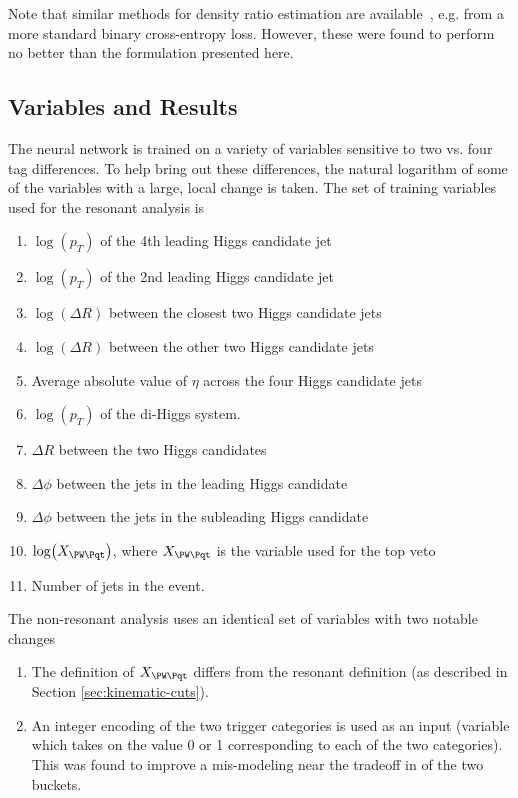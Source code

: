 Note that similar methods for density ratio estimation are available~\cite{NNRW-Nachman},
e.g. from a more standard binary cross-entropy loss. However, these were found to
perform no better than the formulation presented here.

\subsection{Variables and Results}
The neural network is trained on a variety of variables sensitive to two vs.
four tag differences. To help bring out these differences, the natural logarithm 
of some of the variables with a large, local change is taken. The 
set of training variables used for the resonant analysis is
\begin{enumerate}
	\item $\log(p_T)$ of the 4th leading Higgs candidate jet
	\item $\log(p_T)$ of the 2nd leading Higgs candidate jet
	\item $\log(\Delta R)$ between the closest two Higgs candidate jets
	\item $\log(\Delta R)$ between the other two Higgs candidate jets
	\item Average absolute value of $\eta$ across the four Higgs candidate jets
	\item $\log(p_T)$ of the di-Higgs system.
	\item $\Delta R$ between the two Higgs candidates
	\item $\Delta \phi$ between the jets in the leading Higgs candidate
	\item $\Delta \phi$ between the jets in the subleading Higgs candidate
	\item $\log(X_{\PW\Pqt})$, where $X_{\PW\Pqt}$ is the variable used for the top veto
	\item Number of jets in the event.
\end{enumerate}
The non-resonant analysis uses an identical set of variables with two notable changes
\begin{enumerate}
	\item The definition of $X_{\PW\Pqt}$ differs from the resonant definition (as described 
	in Section \ref{sec:kinematic-cuts}).
	\item An integer encoding of the two trigger categories is used as an input (variable which 
	takes on the value 0 or 1 corresponding to each of the two categories). This was found to improve
	a mis-modeling near the tradeoff in \mhh of the two buckets.
\end{enumerate}

